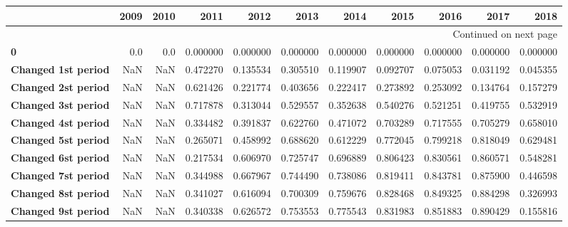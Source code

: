 \begin{longtable}{lrrrrrrrrrr}
\toprule
{} &  2009 &  2010 &         2011 &          2012 &          2013 &          2014 &          2015 &          2016 &         2017 &         2018 \\
\midrule
\endhead
\midrule
\multicolumn{11}{r}{{Continued on next page}} \\
\midrule
\endfoot

\bottomrule
\endlastfoot
\textbf{0                                 } &   0.0 &   0.0 &     0.000000 &      0.000000 &      0.000000 &      0.000000 &      0.000000 &      0.000000 &     0.000000 &     0.000000 \\
\textbf{Changed 1st period                } &   NaN &   NaN &     0.472270 &      0.135534 &      0.305510 &      0.119907 &      0.092707 &      0.075053 &     0.031192 &     0.045355 \\
\textbf{Changed 2st period                } &   NaN &   NaN &     0.621426 &      0.221774 &      0.403656 &      0.222417 &      0.273892 &      0.253092 &     0.134764 &     0.157279 \\
\textbf{Changed 3st period                } &   NaN &   NaN &     0.717878 &      0.313044 &      0.529557 &      0.352638 &      0.540276 &      0.521251 &     0.419755 &     0.532919 \\
\textbf{Changed 4st period                } &   NaN &   NaN &     0.334482 &      0.391837 &      0.622760 &      0.471072 &      0.703289 &      0.717555 &     0.705279 &     0.658010 \\
\textbf{Changed 5st period                } &   NaN &   NaN &     0.265071 &      0.458992 &      0.688620 &      0.612229 &      0.772045 &      0.799218 &     0.818049 &     0.629481 \\
\textbf{Changed 6st period                } &   NaN &   NaN &     0.217534 &      0.606970 &      0.725747 &      0.696889 &      0.806423 &      0.830561 &     0.860571 &     0.548281 \\
\textbf{Changed 7st period                } &   NaN &   NaN &     0.344988 &      0.667967 &      0.744490 &      0.738086 &      0.819411 &      0.843781 &     0.875900 &     0.446598 \\
\textbf{Changed 8st period                } &   NaN &   NaN &     0.341027 &      0.616094 &      0.700309 &      0.759676 &      0.828468 &      0.849325 &     0.884298 &     0.326993 \\
\textbf{Changed 9st period                } &   NaN &   NaN &     0.340338 &      0.626572 &      0.753553 &      0.775543 &      0.831983 &      0.851883 &     0.890429 &     0.155816 \\

\end{longtable}
